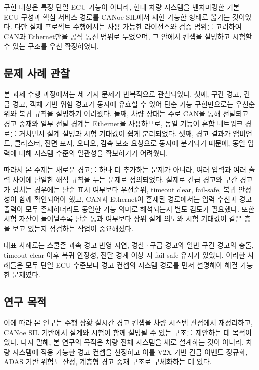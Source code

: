 \documentclass[10pt,a4paper,twocolumn]{article}
\begin{document}
구현 대상은 특정 단일 ECU 기능이 아니라, 현대 차량 시스템을 벤치마킹한 기본 ECU 구성과 핵심 서비스 경로를 CANoe SIL에서 재현 가능한 형태로 옮기는 것이었다. 다만 실제 프로젝트 수행에서는 사용 가능한 라이선스와 검증 범위를 고려하여 CAN과 Ethernet만을 공식 통신 범위로 두었으며, 그 안에서 컨셉을 설명하고 시험할 수 있는 구조를 우선 확정하였다.

\subsection{문제 사례 관찰}

본 과제 수행 과정에서는 세 가지 문제가 반복적으로 관찰되었다. 첫째, 구간 경고, 긴급 경고, 객체 기반 위험 경고가 동시에 유효할 수 있어 단순 기능 구현만으로는 우선순위와 복귀 규칙을 설명하기 어려웠다. 둘째, 차량 상태는 주로 CAN을 통해 전달되고 경고 중재와 일부 전달 경계는 Ethernet을 사용하므로, 동일 기능이 혼합 네트워크 경로를 거치면서 설계 설명과 시험 기대값이 쉽게 분리되었다. 셋째, 경고 결과가 앰비언트, 클러스터, 전면 표시, 오디오, 감속 보조 요청으로 동시에 분기되기 때문에, 동일 입력에 대해 시스템 수준의 일관성을 확보하기가 어려웠다.

따라서 본 주제는 새로운 경고를 하나 더 추가하는 문제가 아니라, 여러 입력과 여러 출력 사이에 단일한 해석 규칙을 두는 문제로 정의되었다. 실제로 긴급 경고와 구간 경고가 겹치는 경우에는 단순 표시 여부보다 우선순위, timeout clear, fail-safe, 복귀 안정성이 함께 확인되어야 했고, CAN과 Ethernet이 혼재된 경로에서는 입력 수신과 경고 출력이 모두 존재하더라도 동일한 기능 의미로 해석되는지 별도 검토가 필요했다. 또한 시험 자산이 늘어날수록 단순 통과 여부보다 상위 설계 의도와 시험 기대값이 같은 층을 보고 있는지 점검하는 작업이 중요해졌다.

대표 사례로는 스쿨존 과속 경고 반영 지연, 경찰·구급 경고와 일반 구간 경고의 충돌, timeout clear 이후 복귀 안정성, 전달 경계 이상 시 fail-safe 유지가 있었다. 이러한 사례들은 모두 단일 ECU 수준보다 경고 컨셉의 시스템 경로를 먼저 설명해야 해결 가능한 문제였다.

\subsection{연구 목적}

이에 따라 본 연구는 주행 상황 실시간 경고 컨셉을 차량 시스템 관점에서 재정리하고, CANoe SIL 기반에서 설계와 시험이 함께 설명될 수 있는 구조를 제안하는 데 목적이 있다. 다시 말해, 본 연구의 목적은 차량 전체 시스템을 새로 설계하는 것이 아니라, 차량 시스템에 적용 가능한 경고 컨셉을 선정하고 이를 V2X 기반 긴급 이벤트 정규화, ADAS 기반 위험도 산정, 계층형 경고 중재 구조로 구체화하는 데 있다.
\end{document}
